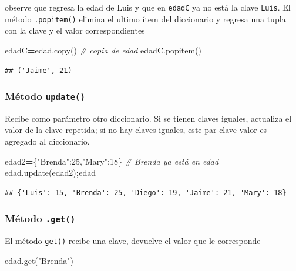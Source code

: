 \documentclass[
]{book}
\newenvironment{Shaded}{\begin{snugshade}}{\end{snugshade}}
\newcommand{\CommentTok}[1]{\textcolor[rgb]{0.56,0.35,0.01}{\textit{#1}}}
\newcommand{\DecValTok}[1]{\textcolor[rgb]{0.00,0.00,0.81}{#1}}
\newcommand{\NormalTok}[1]{#1}
\newcommand{\OperatorTok}[1]{\textcolor[rgb]{0.81,0.36,0.00}{\textbf{#1}}}
\newcommand{\StringTok}[1]{\textcolor[rgb]{0.31,0.60,0.02}{#1}}
\theoremstyle{definition}
\theoremstyle{definition}
\theoremstyle{definition}
\theoremstyle{definition}
\theoremstyle{remark}
\begin{document}
observe que regresa la edad de Luis y que en \texttt{edadC} ya no está la clave \texttt{Luis}. El método \texttt{.popitem()} elimina el ultimo ítem del diccionario y regresa una tupla con la clave y el valor correspondientes

\begin{Shaded}
\begin{Highlighting}[]
\NormalTok{edadC}\OperatorTok{=}\NormalTok{edad.copy() }\CommentTok{\# copia de edad }
\NormalTok{edadC.popitem() }
\end{Highlighting}
\end{Shaded}

\begin{verbatim}
## ('Jaime', 21)
\end{verbatim}

\hypertarget{muxe9todo-update}{%
\subsubsection{\texorpdfstring{Método \texttt{update()}}{Método update()}}\label{muxe9todo-update}}

Recibe como parámetro otro diccionario. Si se tienen claves iguales, actualiza el valor de la clave repetida; si no hay claves iguales, este par clave-valor es agregado al diccionario.

\begin{Shaded}
\begin{Highlighting}[]
\NormalTok{edad2}\OperatorTok{=}\NormalTok{\{}\StringTok{"Brenda"}\NormalTok{:}\DecValTok{25}\NormalTok{,}\StringTok{"Mary"}\NormalTok{:}\DecValTok{18}\NormalTok{\}  }\CommentTok{\# Brenda ya está en edad}
\NormalTok{edad.update(edad2)}\OperatorTok{;}\NormalTok{edad }
\end{Highlighting}
\end{Shaded}

\begin{verbatim}
## {'Luis': 15, 'Brenda': 25, 'Diego': 19, 'Jaime': 21, 'Mary': 18}
\end{verbatim}

\hypertarget{muxe9todo-.get}{%
\subsubsection{\texorpdfstring{Método \texttt{.get()}}{Método .get()}}\label{muxe9todo-.get}}

El método \texttt{get()} recibe una clave, devuelve el valor que le corresponde

\begin{Shaded}
\begin{Highlighting}[]
\NormalTok{edad.get(}\StringTok{"Brenda"}\NormalTok{)  }
\end{Highlighting}
\end{Shaded}
\end{document}
